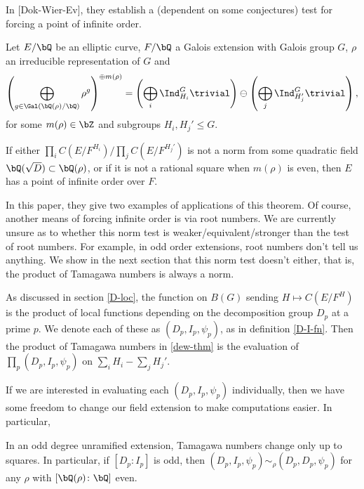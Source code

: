 In [Dok-Wier-Ev], they establish a (dependent on some conjectures) test for forcing a point of infinite order.

\begin{thm}\label{dew-thm}
    Let $E / \bQ$ be an elliptic curve, $F / \bQ$ a Galois extension with Galois group $G$, $\rho$ an irreducible representation of $G$ and 
    \begin{equation}\label{rho-reln}
        \left(\bigoplus_{g \in \Gal(\bQ(\rho) / \bQ)} \rho^g\right)^{\oplus m(\rho)} = 
        \left(\bigoplus_i \Ind_{H_i}^G \trivial \right) \ominus \left(\bigoplus_j \Ind_{H_j'}^G \trivial \right),
    \end{equation}
    for some $m(\rho) \in \bZ$ and subgroups $H_i, H_j' \leq G$. 

    If either $\prod_i C(E / F^{H_i}) / \prod_j  C(E / F^{H_j'})$ is not a norm from some quadratic field $\bQ(\sqrt{D}) \subset \bQ(\rho)$, or if it is not a rational square when $m(\rho)$ is even, then $E$ has a point of infinite order over $F$.
\end{thm}

In this paper, they give two examples of applications of this theorem. Of course, another means of forcing infinite order is via root numbers. We are currently unsure as to whether this norm test is weaker/equivalent/stronger than the test of root numbers. For example, in odd order extensions, root numbers don't tell us anything. We show in the next section that this norm test doesn't either, that is, the product of Tamagawa numbers is always a norm.

\vspace{1em}

As discussed in section \ref{D-loc}, the function on $B(G)$ sending $H \mapsto C(E / F^H)$ is the product of local functions depending on the decomposition group $D_p$ at a prime $p$. We denote each of these as $(D_p, I_p, \psi_p)$, as in definition \ref{D-I-fn}. Then the product of Tamagawa numbers in \ref{dew-thm} is the evaluation of $\prod_p (D_p, I_p, \psi_p)$ on $\sum_i H_i - \sum_j H_j'$.

If we are interested in evaluating each $(D_p, I_p, \psi_p)$ individually, then we have some freedom to change our field extension to make computations easier. In particular, 

\begin{lemma}\label{DeqI}
    In an odd degree unramified extension, Tamagawa numbers change only up to squares. In particular, if $[D_p \colon I_p]$ is odd, then $(D_p, I_p, \psi_p) \sim_{\rho} (D_p, D_p, \psi_p)$ for any $\rho$ with $[\bQ(\rho) \colon \bQ]$ even. 
\end{lemma}

